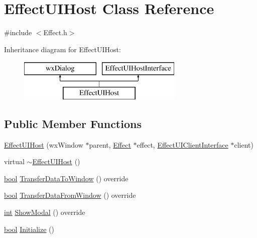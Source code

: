 \hypertarget{class_effect_u_i_host}{}\section{Effect\+U\+I\+Host Class Reference}
\label{class_effect_u_i_host}


{\ttfamily \#include $<$Effect.\+h$>$}

Inheritance diagram for Effect\+U\+I\+Host\+:\begin{figure}[H]
\begin{center}
\leavevmode
\includegraphics[height=2.000000cm]{class_effect_u_i_host}
\end{center}
\end{figure}
\subsection*{Public Member Functions}
\begin{DoxyCompactItemize}
\item 
\hyperlink{class_effect_u_i_host_a9572fad995393954085775404c7e298d}{Effect\+U\+I\+Host} (wx\+Window $\ast$parent, \hyperlink{class_effect}{Effect} $\ast$effect, \hyperlink{class_effect_u_i_client_interface}{Effect\+U\+I\+Client\+Interface} $\ast$client)
\item 
virtual \hyperlink{class_effect_u_i_host_a408075542ad58cab6069be8db454b2f2}{$\sim$\+Effect\+U\+I\+Host} ()
\item 
\hyperlink{mac_2config_2i386_2lib-src_2libsoxr_2soxr-config_8h_abb452686968e48b67397da5f97445f5b}{bool} \hyperlink{class_effect_u_i_host_a57a7b0366e76d2eda7c554efd201557f}{Transfer\+Data\+To\+Window} () override
\item 
\hyperlink{mac_2config_2i386_2lib-src_2libsoxr_2soxr-config_8h_abb452686968e48b67397da5f97445f5b}{bool} \hyperlink{class_effect_u_i_host_aee0e4a591c058ec1983d72ab97a9313f}{Transfer\+Data\+From\+Window} () override
\item 
\hyperlink{xmltok_8h_a5a0d4a5641ce434f1d23533f2b2e6653}{int} \hyperlink{class_effect_u_i_host_a707530b5eaf0c7295a03dfb93e783fc9}{Show\+Modal} () override
\item 
\hyperlink{mac_2config_2i386_2lib-src_2libsoxr_2soxr-config_8h_abb452686968e48b67397da5f97445f5b}{bool} \hyperlink{class_effect_u_i_host_adcab73f26d52eef24076d456febd4580}{Initialize} ()
\end{DoxyCompactItemize}


